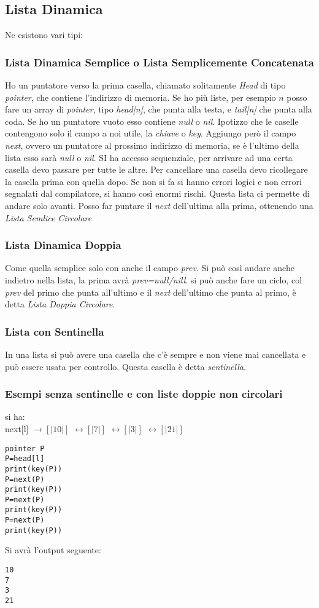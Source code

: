 \documentclass[a4paper,12pt,oneside,tikz]{book}
\begin{document}
\subsection{Lista Dinamica}
Ne esistono vari tipi:
\subsubsection{Lista Dinamica Semplice o Lista Semplicemente Concatenata}
Ho un puntatore verso la prima casella, chiamato solitamente \textit{Head} di tipo \textit{pointer}, che contiene l'indirizzo di memoria. Se ho più liste, per esempio $n$ posso fare un array di \textit{pointer}, tipo \textit{head[n]}, che punta alla testa, e \textit{tail[n]} che punta alla coda. Se ho un puntatore vuoto esso contiene \textit{null} o \textit{nil}. Ipotizzo che le caselle contengono solo il campo a noi utile, la \textit{chiave} o \textit{key}. Aggiungo però il campo \textit{next}, ovvero un puntatore al prossimo indirizzo di memoria, se è l'ultimo della lista esso sarà \textit{null} o \textit{nil}. SI ha accesso sequenziale, per arrivare ad una certa casella devo passare per tutte le altre. Per cancellare una casella devo ricollegare la casella prima con quella dopo. Se non si fa si hanno errori logici e non errori segnalati dal compilatore, si hanno così enormi rischi. Questa lista ci permette di andare solo avanti. Posso far puntare il \textit{next} dell'ultima alla prima, ottenendo una \textit{Lista Semlice Circolare}
\subsubsection{Lista Dinamica Doppia}
Come quella semplice solo con anche il campo \textit{prev}. Si può così andare anche indietro nella lista, la prima avrà \textit{prev=null/nill}. si può anche fare un ciclo, col \textit{prev} del primo che punta all'ultimo e il \textit{next} dell'ultimo che punta al primo, è detta \textit{Lista Doppia Circolare}.
\subsubsection{Lista con Sentinella}
In una lista si può avere una casella che c'è sempre e non viene mai cancellata e può essere usata per controllo. Questa casella è detta \textit{sentinella}. 
\subsubsection{Esempi senza sentinelle e con liste doppie non circolari}
\begin{esempio}
si ha:\\
next[l] $\longrightarrow [ |10 | ]$ $\longleftrightarrow [ | 7| ]$ $\longleftrightarrow [ | 3| ]$ $\longleftrightarrow [ | 21| ]$ 
\begin{verbatim}
pointer P
P=head[l]
print(key(P))
P=next(P)
print(key(P))
P=next(P)
print(key(P))
P=next(P)
print(key(P))
\end{verbatim}
Si avrà l'output seguente:
\begin{verbatim}
10
7
3
21
\end{verbatim}
\end{esempio}
\end{document}
